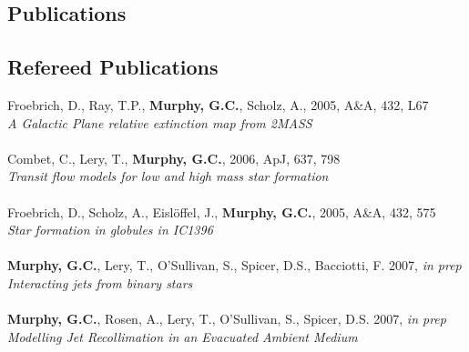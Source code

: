 \subsection*{Publications}

\subsection*{Refereed Publications}
Froebrich, D., Ray, T.P., {\bf Murphy, G.C.}, Scholz, A., 2005, A\&A, 432, L67
\\
\emph{A Galactic Plane relative extinction map from 2MASS}
\\
\\Combet, C., Lery, T., {\bf Murphy, G.C.}, 2006, ApJ, 637, 798
\\
\emph{Transit flow models for low and high mass star formation}
\\
\\Froebrich, D., Scholz, A., Eisl\"offel, J., {\bf Murphy, G.C.}, 2005, A\&A,
432, 575
\\
\emph{Star formation in globules in IC1396}
\\
\\{\bf Murphy, G.C.}, Lery, T., O'Sullivan, S., Spicer, D.S., Bacciotti, F. 2007,
\emph{in prep}
\\
\emph{Interacting jets from binary stars}
\\
\\{\bf Murphy, G.C.}, Rosen, A., Lery, T., O'Sullivan, S., Spicer, D.S. 2007,
\emph{in prep}
\\
\emph{Modelling Jet Recollimation in an Evacuated Ambient Medium}




